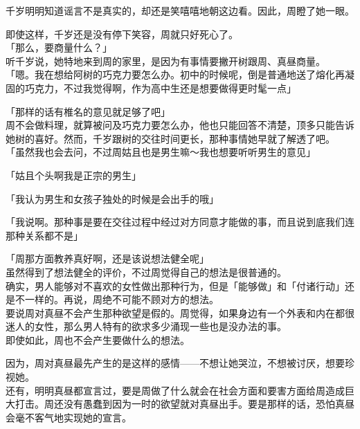 千岁明明知道谣言不是真实的，却还是笑嘻嘻地朝这边看。因此，周瞪了她一眼。

即使这样，千岁还是没有停下笑容，周就只好死心了。\\

「那么，要商量什么？」\\

听千岁说，她特地来到周的家里，是因为有事情要撇开树跟周、真昼商量。\\

「嗯。我在想给阿树的巧克力要怎么办。初中的时候呢，倒是普通地送了熔化再凝固的巧克力，不过我觉得啊，作为高中生还是想要做得更时髦一点」

「那样的话有椎名的意见就足够了吧」\\

周不会做料理，就算被问及巧克力要怎么办，他也只能回答不清楚，顶多只能告诉她树的喜好。然而，千岁跟树的交往时间更长，那种事情她早就了解透了吧。\\

「虽然我也会去问，不过周姑且也是男生嘛～我也想要听听男生的意见」

「姑且个头啊我是正宗的男生」

「我认为男生和女孩子独处的时候是会出手的哦」

「我说啊。那种事是要在交往过程中经过对方同意才能做的事，而且说到底我们连那种关系都不是」

「周那方面教养真好啊，还是该说想法健全呢」\\

虽然得到了想法健全的评价，不过周觉得自己的想法是很普通的。\\

确实，男人能够对不喜欢的女性做出那种行为，但是「能够做」和「付诸行动」还是不一样的。再说，周绝不可能不顾对方的想法。\\

要说周对真昼不会产生那种欲望是假的。周觉得，如果身边有一个外表和内在都很迷人的女性，那么男人特有的欲求多少涌现一些也是没办法的事。\\

即使如此，周也不会产生要做什么的想法。

因为，周对真昼最先产生的是这样的感情——不想让她哭泣，不想被讨厌，想要珍视她。\\

还有，明明真昼都宣言过，要是周做了什么就会在社会方面和要害方面给周造成巨大打击。周还没有愚蠢到因为一时的欲望就对真昼出手。要是那样的话，恐怕真昼会毫不客气地实现她的宣言。\\

